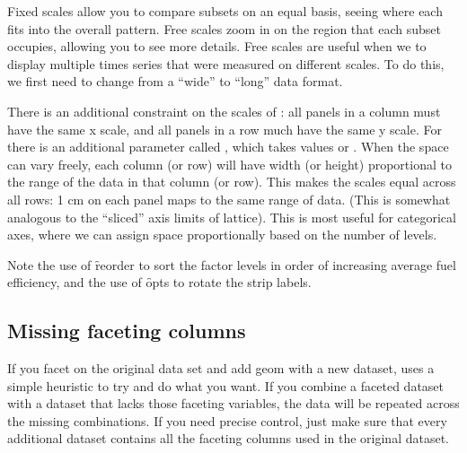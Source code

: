 Fixed scales allow you to compare subsets on an equal basis, seeing where each fits into the overall pattern.  Free scales zoom in on the region that each subset occupies, allowing you to see more details.  Free scales are useful when we to display multiple times series that were measured on different scales.  To do this, we first need to change from a ``wide'' to ``long'' data format.

% 


There is an additional constraint on the scales of : all panels in a column must have the same x scale, and all panels in a row much have the same y scale.  For  there is an additional parameter called , which takes values  or .  When the space can vary freely, each column (or row) will have width (or height) proportional to the range of the data in that column (or row).  This makes the scales equal across all rows: 1 cm on each panel maps to the same range of data.  (This is somewhat analogous to the ``sliced'' axis limits of lattice).  This is most useful for categorical axes, where we can assign space proportionally based on the number of levels.

% 
% 
% 


Note the use of \f{reorder} to sort the factor levels in order of increasing average fuel efficiency, and the use of \f{opts} to rotate the strip labels.

\subsection{Missing faceting columns}
\label{sub:missing_faceting_columns}

If you facet on the original data set and add geom with a new dataset, \ggplot uses a simple heuristic to try and do what you want.  If you combine a faceted dataset with a dataset that lacks those faceting variables, the data will be repeated across the missing combinations. If you need precise control, just make sure that every additional dataset contains all the faceting columns used in the original dataset.


